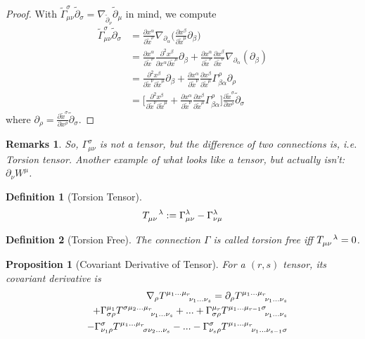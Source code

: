 \documentclass[a4paper]{article}
\newtheorem{remarks}{Remarks}[section]
\theoremstyle{new}
\newtheorem{defi}{Definition}[section]
\newtheorem{prop}{Proposition}[section]
\begin{document}
\begin{proof}
With $\tilde{\Gamma}^\sigma_{\mu\nu}\tilde{\partial}_\sigma=\nabla_{\tilde{\partial}_\nu}\tilde{\partial}_\mu$ in mind, we compute
\begin{align}
    \tilde{\Gamma}^\sigma_{\mu\nu}\tilde{\partial}_\sigma&=\frac{\partial x^\alpha}{\partial\tilde{x}^\nu}\nabla_{\partial_\alpha}\bigg(\frac{\partial x^\beta}{\partial\tilde{x}^\mu}\partial_\beta\bigg)\nonumber\\&=\frac{\partial x^\alpha}{\partial\tilde{x}^\nu}\frac{\partial^2x^\beta}{\partial x^\alpha\partial\tilde{x}^\mu}\partial_\beta+\frac{\partial x^\alpha}{\partial\tilde{x}^\nu}\frac{\partial x^\beta}{\partial\tilde{x}^\nu}\nabla_{\partial_\alpha}(\partial_\beta)\nonumber\\&=\frac{\partial^2x^\beta}{\partial\tilde{x}^\nu\partial\tilde{x}^\mu}\partial_\beta+\frac{\partial x^\alpha}{\partial\tilde{x}^\nu}\frac{\partial x^\beta}{\partial\tilde{x}^\mu}\Gamma_{\beta\alpha}^\rho\partial_\rho\nonumber\\&=\bigg[\frac{\partial^2x^\beta}{\partial\tilde{x}^\nu\partial\tilde{x}^\mu}+\frac{\partial x^\alpha}{\partial\tilde{x}^\nu}\frac{\partial x^\beta}{\partial\tilde{x}^\mu}\Gamma_{\beta\alpha}^\rho\bigg]\frac{\partial\tilde{x}^\sigma}{\partial x^\rho}\tilde{\partial}_\sigma\nonumber
\end{align}
where $\partial_\rho=\frac{\partial\tilde{x}^\sigma}{\partial x^\rho}\tilde{\partial}_\sigma$.
\end{proof}
\begin{remarks}
So, $\Gamma_{\mu\nu}^\sigma$ is not a tensor, but the difference of two connections is, i.e. Torsion tensor. Another example of what looks like a tensor, but actually isn't: $\partial_\nu W^\mu$. 
\end{remarks}
\begin{defi}[Torsion Tensor]
$$\tensor*{T}{*^{}_{\mu\nu}^{\lambda}}:=\Gamma_{\mu\nu}^\lambda-\Gamma_{\nu\mu}^\lambda$$
\end{defi}
\begin{defi}[Torsion Free]
The connection $\Gamma$ is called torsion free iff $\tensor*{T}{*^{}_{\mu\nu}^{\lambda}}=0$.
\end{defi}
\begin{prop}[Covariant Derivative of Tensor]
For a $(r,s)$ tensor, its covariant derivative is
\begin{eqnarray}
&&\nabla_\rho\tensor*{T}{*_{}^{\mu_1...\mu_r}_{\nu_1...\nu_s}}=\partial_\rho\tensor*{T}{*_{}^{\mu_1...\mu_r}_{\nu_1...\nu_s}}\nonumber\\&&+\Gamma^{\mu_1}_{\sigma\rho}\tensor*{T}{*_{}^{\sigma\mu_2...\mu_r}_{\nu_1...\nu_s}}+...+\Gamma_{\sigma\rho}^{\mu_r}\tensor*{T}{*_{}^{\mu_1...\mu_{r-1}\sigma}_{\nu_1...\nu_s}}\nonumber\\&&-\Gamma_{\nu_1\rho}^\sigma \tensor*{T}{*_{}^{\mu_1...\mu_r}_{\sigma\nu_2...\nu_s}}-...-\Gamma_{\nu_s\rho}^\sigma \tensor*{T}{*_{}^{\mu_1...\mu_r}_{\nu_1...\nu_{s-1}\sigma}}\nonumber
\end{eqnarray}
\end{prop}
\end{document}
